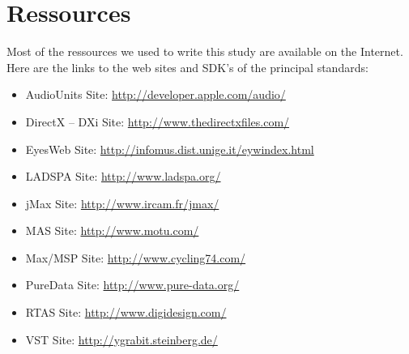
\appendix

\chapter{Ressources}


\noindent Most of the ressources we used to write this study are available on the Internet. Here are the links to the web sites and SDK's of the principal standards:\\

\begin{itemize}
\item AudioUnits Site: \url{http://developer.apple.com/audio/} 
\item DirectX -- DXi Site: \url{http://www.thedirectxfiles.com/} 
\item EyesWeb Site: \url{http://infomus.dist.unige.it/eywindex.html} 
\item LADSPA Site: \url{http://www.ladspa.org/} 
\item jMax Site: \url{http://www.ircam.fr/jmax/} 
\item MAS Site: \url{http://www.motu.com/} 
\item Max/MSP Site: \url{http://www.cycling74.com/} 
\item PureData Site: \url{http://www.pure-data.org/} 
\item RTAS Site: \url{http://www.digidesign.com/} 
\item VST Site: \url{http://ygrabit.steinberg.de/} 
\end{itemize}
